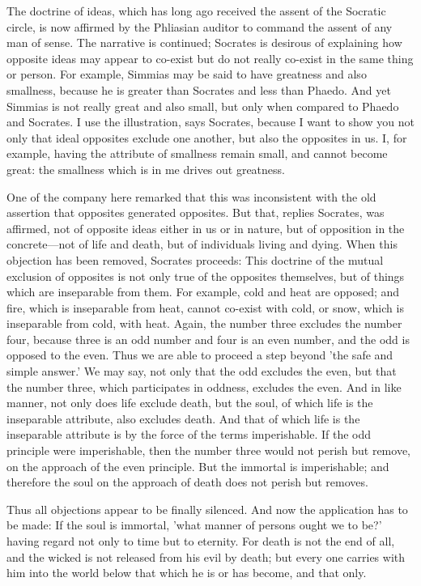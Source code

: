 The doctrine of ideas, which has long ago received the assent of the
Socratic circle, is now affirmed by the Phliasian auditor to command the
assent of any man of sense. The narrative is continued; Socrates is
desirous of explaining how opposite ideas may appear to co-exist but do
not really co-exist in the same thing or person. For example, Simmias may
be said to have greatness and also smallness, because he is greater than
Socrates and less than Phaedo. And yet Simmias is not really great and
also small, but only when compared to Phaedo and Socrates. I use the
illustration, says Socrates, because I want to show you not only that
ideal opposites exclude one another, but also the opposites in us. I, for
example, having the attribute of smallness remain small, and cannot become
great: the smallness which is in me drives out greatness.

One of the company here remarked that this was inconsistent with the old
assertion that opposites generated opposites. But that, replies Socrates,
was affirmed, not of opposite ideas either in us or in nature, but of
opposition in the concrete—not of life and death, but of individuals
living and dying. When this objection has been removed, Socrates proceeds:
This doctrine of the mutual exclusion of opposites is not only true of the
opposites themselves, but of things which are inseparable from them. For
example, cold and heat are opposed; and fire, which is inseparable from
heat, cannot co-exist with cold, or snow, which is inseparable from cold,
with heat. Again, the number three excludes the number four, because three
is an odd number and four is an even number, and the odd is opposed to the
even. Thus we are able to proceed a step beyond 'the safe and simple
answer.' We may say, not only that the odd excludes the even, but that the
number three, which participates in oddness, excludes the even. And in
like manner, not only does life exclude death, but the soul, of which life
is the inseparable attribute, also excludes death. And that of which life
is the inseparable attribute is by the force of the terms imperishable. If
the odd principle were imperishable, then the number three would not
perish but remove, on the approach of the even principle. But the immortal
is imperishable; and therefore the soul on the approach of death does not
perish but removes.

Thus all objections appear to be finally silenced. And now the application
has to be made: If the soul is immortal, 'what manner of persons ought we
to be?' having regard not only to time but to eternity. For death is not
the end of all, and the wicked is not released from his evil by death; but
every one carries with him into the world below that which he is or has
become, and that only.

